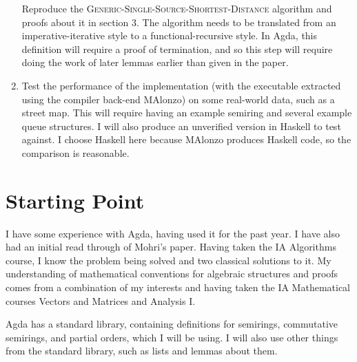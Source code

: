 \begin{enumerate}
    Reproduce the \textsc{Generic-Single-Source-Shortest-Distance} algorithm and proofs about it in section 3.
    The algorithm needs to be translated from an imperative-iterative style to a functional-recursive style.
    In Agda, this definition will require a proof of termination, and so this step will require doing the work of later lemmas earlier than given in the paper.
  \item
    Test the performance of the implementation (with the executable extracted using the compiler back-end MAlonzo) on some real-world data, such as a street map.
    This will require having an example semiring and several example queue structures.
    I will also produce an unverified version in Haskell to test against.
    I choose Haskell here because MAlonzo produces Haskell code, so the comparison is reasonable.
\end{enumerate}

\section*{Starting Point}
I have some experience with Agda, having used it for the past year.
I have also had an initial read through of Mohri's paper.
Having taken the IA Algorithms course, I know the problem being solved and two classical solutions to it.
My understanding of mathematical conventions for algebraic structures and proofs comes from a combination of my interests and having taken the IA Mathematical courses Vectors and Matrices and Analysis I.

Agda has a standard library\cite{stdlib}, containing definitions for semirings, commutative semirings, and partial orders, which I will be using.
I will also use other things from the standard library, such as lists and lemmas about them.

